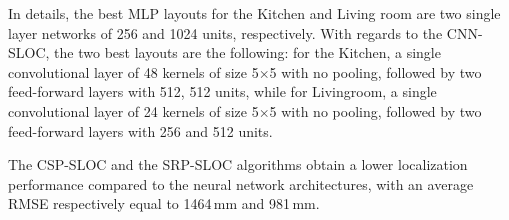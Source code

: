 \documentclass[review]{elsarticle}
\begin{document}
In details, the best MLP layouts for the Kitchen and Living room are two single layer networks of 256 and 1024 units, respectively. %
With regards to the CNN-SLOC, the two best layouts are the following: for the Kitchen, a single convolutional layer of 48 kernels of size 5$\times$5 with no pooling, followed by two feed-forward layers with 512, 512 units, while for Livingroom, a single convolutional layer of 24 kernels of size 5$\times$5 with no pooling, followed by two feed-forward layers with 256 and 512 units.

The CSP-SLOC and the SRP-SLOC algorithms obtain a lower localization performance compared to the neural network architectures, with an average RMSE respectively equal to 1464\,mm and 981\,mm.



\newenvironment{customlegend}[1][]{%
	\begingroup
	\csname pgfplots@init@cleared@structures\endcsname
	\pgfplotsset{#1}%
}{%
\csname pgfplots@createlegend\endcsname
\endgroup
}%

\def\addlegendimage{\csname pgfplots@addlegendimage\endcsname}
\end{document}
